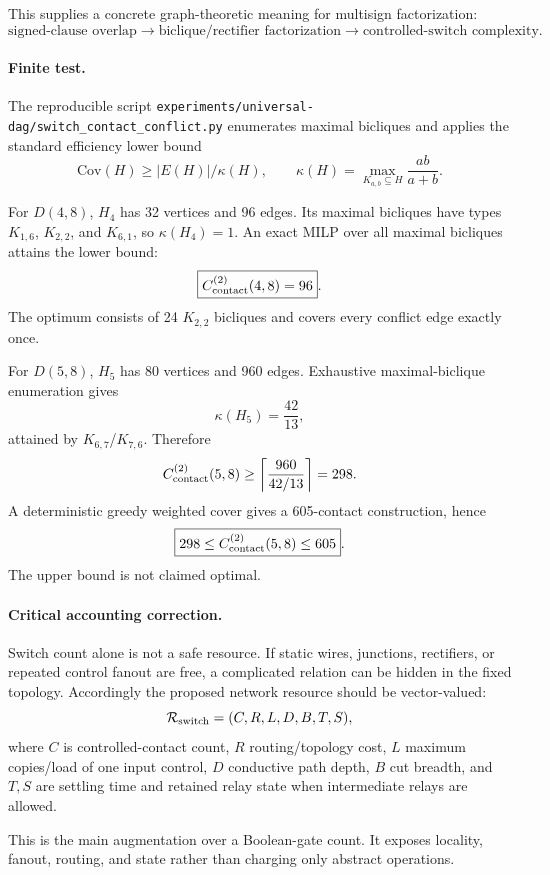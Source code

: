 This supplies a concrete graph-theoretic meaning for multisign factorization:
\[
\boxed{
\text{signed-clause overlap}
\to
\text{biclique/rectifier factorization}
\to
\text{controlled-switch complexity}.
}
\]

\paragraph{Finite test.}
The reproducible script
\texttt{experiments/universal-dag/switch\_contact\_conflict.py}
enumerates maximal bicliques and applies the standard efficiency lower bound
\[
\mathrm{Cov}(H)\ge |E(H)|/\kappa(H),
\qquad
\kappa(H)=\max_{K_{a,b}\subseteq H}\frac{ab}{a+b}.
\]

For \(D(4,8)\), \(H_4\) has 32 vertices and 96 edges. Its maximal bicliques have
types \(K_{1,6}\), \(K_{2,2}\), and \(K_{6,1}\), so \(\kappa(H_4)=1\).
An exact MILP over all maximal bicliques attains the lower bound:
\[
\boxed{C^{(2)}_{\rm contact}(4,8)=96}.
\]
The optimum consists of 24 \(K_{2,2}\) bicliques and covers every conflict edge exactly once.

For \(D(5,8)\), \(H_5\) has 80 vertices and 960 edges. Exhaustive maximal-biclique
enumeration gives
\[
\kappa(H_5)=\frac{42}{13},
\]
attained by \(K_{6,7}\)/\(K_{7,6}\). Therefore
\[
C^{(2)}_{\rm contact}(5,8)\ge
\left\lceil\frac{960}{42/13}\right\rceil
=298.
\]
A deterministic greedy weighted cover gives a 605-contact construction, hence
\[
\boxed{298\le C^{(2)}_{\rm contact}(5,8)\le605}.
\]
The upper bound is not claimed optimal.

\paragraph{Critical accounting correction.}
Switch count alone is not a safe resource. If static wires, junctions, rectifiers, or repeated
control fanout are free, a complicated relation can be hidden in the fixed topology.
Accordingly the proposed network resource should be vector-valued:
\[
\mathcal R_{\rm switch}
=(C,R,L,D,B,T,S),
\]
where \(C\) is controlled-contact count, \(R\) routing/topology cost, \(L\) maximum
copies/load of one input control, \(D\) conductive path depth, \(B\) cut breadth,
and \(T,S\) are settling time and retained relay state when intermediate relays are allowed.

This is the main augmentation over a Boolean-gate count. It exposes locality, fanout, routing,
and state rather than charging only abstract operations.

